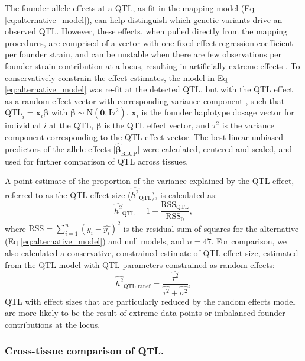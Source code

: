 \documentclass[9pt,twocolumn,twoside]{gsajnl}
\newcommand{\bbeta}{\boldsymbol{\beta}}
\newcommand{\bzero}{\mathbf{0}}
\newcommand{\bI}{\mathbf{I}}
\newcommand{\bx}{\mathbf{x}}
\newcommand{\tausq}{\tau^{2}}
\newcommand{\qtl}{\widehat{h^{2}}_{\text{QTL}}}
\begin{document}
The founder allele effects at a QTL, as fit in the mapping model (Eq \ref{eq:alternative_model}), can help distinguish which genetic variants drive an observed QTL. However, these effects, when pulled directly from the mapping procedures, are comprised of a vector with one fixed effect regression coefficient per founder strain, and can be unstable when there are few observations per founder strain contribution at a locus, resulting in artificially extreme effects \citep{Zhang2014}. To conservatively constrain the effect estimates, the model in Eq \ref{eq:alternative_model} was re-fit at the detected QTL, but with the QTL effect as a random effect vector with corresponding variance component \citep{Wei2016}, such that $\text{QTL}_{i} = \bx_{i}\bbeta$ with $\bbeta \sim \text{N}(\bzero, \bI\tausq)$. $\bx_{i}$ is the founder haplotype dosage vector for individual $i$ at the QTL, $\bbeta$ is the QTL effect vector, and $\tausq$ is the variance component corresponding to the QTL effect vector. The best linear unbiased predictors of the allele effects [$\widehat{\bbeta}_{\text{BLUP}}$] \citep{Robinson1991} were calculated, centered and scaled, and used for further comparison of QTL across tissues. 

A point estimate of the proportion of the variance explained by the QTL effect, referred to as the QTL effect size ($\qtl$), is calculated as:
\begin{equation}
    \qtl = 1 - \frac{\text{RSS}_{\text{QTL}}}{\text{RSS}_{0}},
    \label{eq:effect_size}
\end{equation}
where $\text{RSS} = \sum_{i = 1}^{n}(y_{i} - \widehat{y_{i}})^{2}$ is the residual sum of squares for the alternative (Eq \ref{eq:alternative_model}) and null models, and $n = 47$. For comparison, we also calculated a conservative, constrained estimate of QTL effect size, estimated from the QTL model with QTL parameters constrained as random effects:
\begin{equation}
    \widehat{h^{2}}_{\text{QTL ranef}} = \frac{\widehat{\tau^{2}}}{\widehat{\tau^{2}} + \widehat{\sigma^{2}}},
    \label{eq:effect_size_ranef}
\end{equation}
QTL with effect sizes that are particularly reduced by the random effects model are more likely to be the result of extreme data points or imbalanced founder contributions at the locus.

\subsubsection{Cross-tissue comparison of QTL.}
\end{document}
